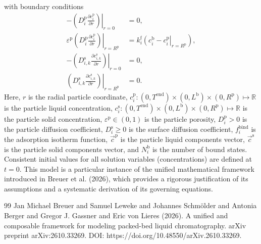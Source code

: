 \documentclass{article}
\begin{document}
with boundary conditions
\begin{align}
    - \left. \left( D^{\mathrm{p}}_{i} \frac{\partial c^{\mathrm{p}}_{i}}{\partial r} \right) \right|_{r=0}
    &= 0,
    \\
    \varepsilon^{\mathrm{p}} \left. \left( D^{\mathrm{p}}_{i} \frac{\partial c^{\mathrm{p}}_{i}}{\partial r} \right)\right|_{r = R^{\mathrm{p}}}
    &= k^{\mathrm{f}}_{i} \left. \left( c^{\mathrm{b}}_{i} - c^{\mathrm{p}}_{i} \right|_{r = R^{\mathrm{p}}} \right),
    \\
    - \left( \left. D^{\mathrm{s}}_{i,k} \frac{\partial c^{\mathrm{s}}_{i,k}}{\partial r} \right) \right|_{r=0}
    &= 0,
    \\
    \left( \left. D^{\mathrm{s}}_{i,k} \frac{\partial c^{\mathrm{s}}_{i,k}}{\partial r} \right) \right|_{r = R^{\mathrm{p}}}
    &= 0.
\end{align}
Here, $r$ is the radial particle coordinate, $c^{\mathrm{p}}_{i}\colon (0, T^{\mathrm{end}}) \times (0, L^{\mathrm{b}})\times (0, R^{\mathrm{p}}) \mapsto \mathbb{R}$ is the particle liquid concentration, $c^{\mathrm{s}}_{i}\colon (0, T^{\mathrm{end}}) \times (0, L^{\mathrm{b}})\times (0, R^{\mathrm{p}}) \mapsto \mathbb{R}$ is the particle solid concentration, $\varepsilon^{\mathrm{p}}\in (0, 1)$ is the particle porosity, $D^{\mathrm{p}}_{i}> 0$ is the particle diffusion coefficient, $D^{\mathrm{s}}_{i}\geq 0$ is the surface diffusion coefficient, $f^{\mathrm{bind}}_{i}$ is the adsorption isotherm function, $\vec{c}^{\mathrm{p}}$ is the particle liquid components vector, $\vec{c}^{\mathrm{s}}$ is the particle solid components vector, and $N^{\mathrm{b}}_{i}$ is the number of bound states.
Consistent initial values for all solution variables (concentrations) are defined at $t = 0$.
This model is a particular instance of the unified mathematical framework introduced in Breuer et al. (2026), which provides a rigorous justification of its assumptions and a systematic derivation of its governing equations.
\begin{thebibliography}{99}
     Jan Michael Breuer and Samuel Leweke and Johannes Schmölder and Antonia Berger and Gregor J. Gassner and Eric von Lieres (2026). A unified and composable framework for modeling packed-bed liquid chromatography. arXiv preprint arXiv:2610.33269. DOI: https://doi.org/10.48550/arXiv.2610.33269.
\end{thebibliography}
\end{document}
